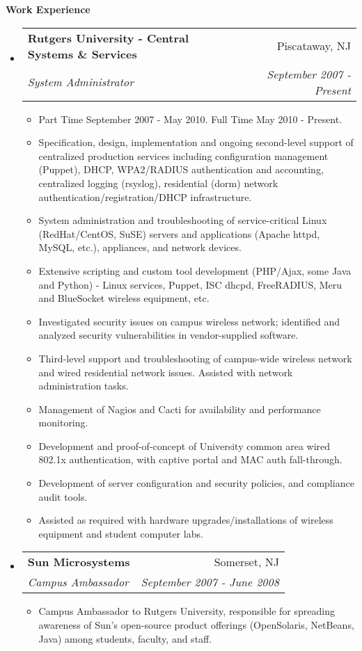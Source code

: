 \documentclass[letterpaper,11pt]{article}
\makeatletter
\newcommand{\resitem}[1]{\item #1 \vspace{-2pt}}
\newcommand{\resheading}[1]{{\large \colorbox{mygrey}{\begin{minipage}{\textwidth}{\textbf{#1 \vphantom{p\^{E}}}}\end{minipage}}}}
\newcommand{\ressubheading}[4]{
\begin{tabular*}{7.0in}{l@{\extracolsep{\fill}}r}
		\textbf{#1} & #2 \\
		\textit{#3} & \textit{#4} \\
\end{tabular*}\vspace{-6pt}}
\makeatother
\begin{document}
\resheading{Work Experience}
\begin{itemize}
\item
	\ressubheading{Rutgers University - Central Systems \&
          Services}{Piscataway, NJ}{System Administrator}{September 2007 - Present}
	\begin{itemize}
                \resitem{Part Time September 2007 - May 2010. Full Time May 2010 - Present.}
                \resitem{Specification, design, implementation and ongoing second-level support of centralized production services including configuration management (Puppet), DHCP, WPA2/RADIUS authentication and accounting, centralized logging (rsyslog), residential (dorm) network authentication/registration/DHCP infrastructure.}
                \resitem{System administration and troubleshooting of
                  service-critical Linux (RedHat/CentOS, SuSE) servers and
                  applications (Apache httpd, MySQL, etc.), appliances, and network devices.}
                \resitem{Extensive scripting and custom tool development
                  (PHP/Ajax, some Java and Python)
                  - Linux services, Puppet, ISC dhcpd, FreeRADIUS, Meru and BlueSocket wireless equipment, etc.}
                \resitem{Investigated security issues on campus wireless network; identified and analyzed security vulnerabilities in vendor-supplied software.}
                \resitem{Third-level support and troubleshooting of campus-wide wireless network and wired residential network issues. Assisted with network administration tasks.}
                \resitem{Management of Nagios and Cacti for availability and performance monitoring.}
		\resitem{Development and proof-of-concept of University common area wired 802.1x authentication, with captive portal and MAC auth fall-through.}
		\resitem{Development of server configuration and security
                  policies, and compliance audit tools.}
                \resitem{Assisted as required with hardware upgrades/installations of wireless equipment and student computer labs.}
	\end{itemize}

\item
        \ressubheading{Sun Microsystems}{Somerset, NJ}{Campus Ambassador}{September 2007 - June 2008}
        \begin{itemize}
                \resitem{Campus Ambassador to Rutgers University, responsible for spreading awareness of Sun's open-source product offerings (OpenSolaris, NetBeans, Java) among students, faculty, and staff.}
        \end{itemize}


\end{itemize}
\end{document}
